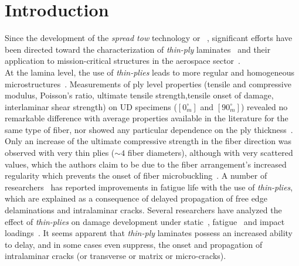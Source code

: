 \documentclass[review]{elsarticle}
\begin{document}
\linenumbers


\section{Introduction}

Since the development of the \emph{spread tow} technology or ~\cite{Kawabe2008,Kawabe2008en}, significant efforts have been directed toward the characterization of \emph{thin-ply} laminates~\cite{Sasayama2003,Yamaguchi2005,Tsai2005,Sihn2007,Yokozeki2008,Yokozeki2010,Saito2012,Arteiro2013,Arteiro2014,Amacher2014,Guillamet2014,Huang2018,Cugnoni2018} and their application to mission-critical structures in the aerospace sector~\cite{Moon2011,Kim2017,Kopp2017,McCarville2018}.\\
At the lamina level, the use of \emph{thin-plies} leads to more regular and homogeneous microstructures~\cite{Saito2012,Amacher2014}. Measurements of ply level properties (tensile and compressive modulus, Poisson's ratio, ultimate tensile strength,tensile onset of damage, interlaminar shear strength) on UD specimens ($\left[0_{m}^{\circ}\right]$ and $\left[90_{m}^{\circ}\right]$) revealed no remarkable difference with average properties available in the literature for the same type of fiber, nor showed any particular dependence on the ply thickness~\cite{Amacher2014}. Only an increase of the ultimate compressive strength in the fiber direction was observed with very thin plies ($\sim4$ fiber diameters), although with very scattered values, which the authors claim to be due to the fiber arrangement's increased regularity which prevents the onset of fiber microbuckling~\cite{Amacher2014}. A number of researchers~\cite{Yamaguchi2005,Tsai2005,Sihn2007,Yokozeki2008} has reported improvements in fatigue life with the use of \emph{thin-plies}, which are explained as a consequence of delayed propagation of free edge delaminations and intralaminar cracks. Several researchers have analyzed the effect of \emph{thin-plies} on damage development under static~\cite{Sasayama2003,Sihn2007,Yokozeki2008,Yokozeki2010,Saito2012,Arteiro2013,Arteiro2014,Amacher2014}, fatigue~\cite{Yamaguchi2005,Sihn2007,Yokozeki2008,Yokozeki2010,Amacher2014} and impact loadings~\cite{Sihn2007,Yokozeki2008,Yokozeki2010,Amacher2014}. It seems apparent that \emph{thin-ply} laminates possess an increased ability to delay, and in some cases even suppress, the onset and propagation of intralaminar cracks (or transverse or matrix or micro-cracks).\\
\end{document}
